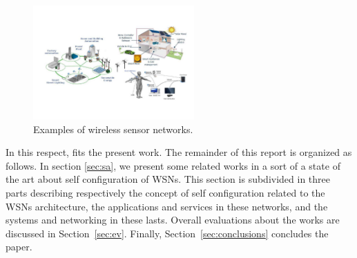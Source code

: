 \begin{figure}[t]
\vspace{-4mm}
\centering
 \includegraphics[width=0.55\textwidth]{fig.pdf}
 \vspace{-4mm} 
 \caption{Examples of wireless sensor networks.}
 \vspace{-4mm}
  \label{fig:scenario}
\end{figure}


In this respect, fits the present work.
The remainder of this report is organized as follows. In section
\ref{sec:sa}, we present some related works in a sort of a state of the art
about self configuration of WSNs. This section is subdivided in three parts
describing respectively the concept of self configuration related to the WSNs architecture, the applications and services in these networks, and the systems
and networking in these lasts. Overall evaluations about the works are
discussed in Section~\ref{sec:ev}. Finally, Section~\ref{sec:conclusions} concludes the paper.
